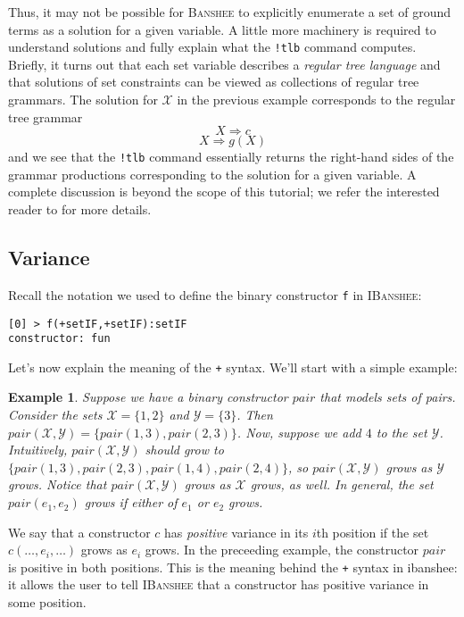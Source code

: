 \documentclass[10pt]{article}
\newcommand{\banshee}{\textsc{Banshee}}
\newcommand{\ibanshee}{\textsc{IBanshee}}
\newcommand{\var}[1]{\mathcal{#1}}
\newtheorem{example}{Example}
\begin{document}
Thus, it may not be possible for \banshee{} to explicitly enumerate a
set of ground terms as a solution for a given variable. A little more
machinery is required to understand solutions and fully explain what
the \texttt{!tlb} command computes.  Briefly, it turns out that each
set variable describes a \emph{regular tree language} and that
solutions of set constraints can be viewed as collections of regular
tree grammars. The solution for $\var{X}$ in the previous example
corresponds to the regular tree grammar
\[
X \Rightarrow c
\]
\[
X \Rightarrow g(X)
\]
and we see that the \texttt{!tlb} command essentially returns the
right-hand sides of the grammar productions corresponding to the
solution for a given variable. A complete discussion is beyond the
scope of this tutorial; we refer the interested reader to
\cite{heintze:thesis} for more details.

\subsection{Variance}

Recall the notation we used to define the binary constructor
\texttt{f} in \ibanshee{}:

\begin{verbatim}
[0] > f(+setIF,+setIF):setIF
constructor: fun
\end{verbatim}

Let's now explain the meaning of the \texttt{+} syntax. We'll start with a simple example:

\begin{example}
Suppose we have a binary constructor $pair$ that models sets of
pairs. Consider the sets $\var{X} = \{1,2\}$ and $\var{Y} =
\{3\}$. Then $pair(\var{X}, \var{Y}) = \{pair(1,3),pair(2,3)\}$. Now,
suppose we add $4$ to the set $\var{Y}$. Intuitively, $pair(\var{X},
\var{Y})$ should grow to
$\{pair(1,3),pair(2,3),pair(1,4),pair(2,4)\}$, so
$pair(\var{X},\var{Y})$ grows as $\var{Y}$ grows. Notice that
$pair(\var{X},\var{Y})$ grows as $\var{X}$ grows, as well. In general,
the set $pair(e_1,e_2)$ grows if either of $e_1$ or $e_2$ grows.
\end{example}

We say that a constructor $c$ has \emph{positive} variance in its
$i$th position if the set $c(\ldots,e_i,\ldots)$ grows as $e_i$
grows. In the preceeding example, the constructor $pair$ is positive
in both positions. This is the meaning behind the \texttt{+} syntax in
ibanshee{}: it allows the user to tell \ibanshee{} that a constructor
has positive variance in some position.
\end{document}
